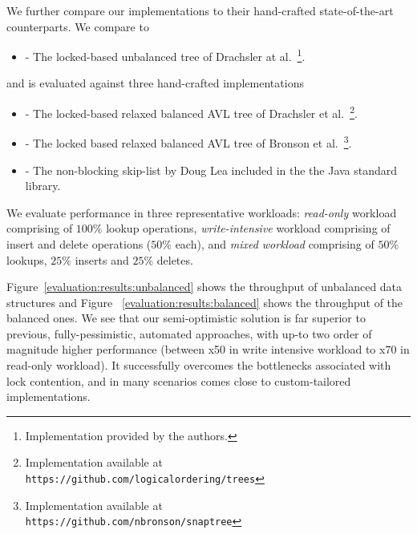 We further compare our implementations to their hand-crafted state-of-the-art counterparts. We compare \autoTree to
\begin{itemize}
\item \danaTree - The locked-based 
				unbalanced tree of Drachsler at al.~\cite{DrachslerVY2014}\footnote{Implementation provided by the authors.}. 
\end{itemize}
and \autoTreap is evaluated against three hand-crafted implementations
\begin{itemize}
\item \danaAVL - The locked-based relaxed balanced AVL tree of 
				Drachsler et al.~\cite{DrachslerVY2014}\footnote{Implementation available at \\
				\texttt{https://github.com/logicalordering/trees}}.
\item \bronson - The locked based relaxed balanced AVL tree
				of Bronson et al.~\cite{BronsonCCO2010}\footnote{Implementation available at \\
				\texttt{https://github.com/nbronson/snaptree}}.
\item \skiplist - The non-blocking skip-list by Doug 
				Lea included in the 
				the Java standard library.
\end{itemize}

We evaluate performance in three representative workloads: \emph{read-only}
workload comprising of $100\%$ lookup operations, \emph{write-intensive}
workload comprising of insert and delete operations ($50\%$ each), and
\emph{mixed workload} comprising of $50\%$ lookups, $25\%$ inserts and $25\%$
deletes.

Figure~\ref{evaluation:results:unbalanced} 
shows the throughput of unbalanced data structures and Figure~
\ref{evaluation:results:balanced} shows
the throughput of the balanced ones. We see that our semi-optimistic
solution is far superior to previous, fully-pessimistic, 
automated approaches, with up-to two order of magnitude higher performance
(between x50 in write intensive workload to x70 in read-only workload). It
successfully overcomes the bottlenecks associated with lock contention, and in many scenarios comes close to custom-tailored implementations.

\begin{figure*}
\begin{center}

\end{center}
\caption{Throughput of unbalanced data structures.}
\label{evaluation:results:unbalanced}
\end{figure*}


